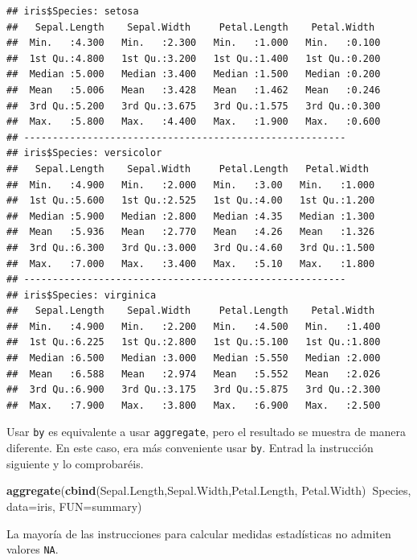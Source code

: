 \documentclass[]{book}
\newenvironment{Shaded}{\begin{snugshade}}{\end{snugshade}}
\newcommand{\DataTypeTok}[1]{\textcolor[rgb]{0.13,0.29,0.53}{#1}}
\newcommand{\KeywordTok}[1]{\textcolor[rgb]{0.13,0.29,0.53}{\textbf{#1}}}
\newcommand{\NormalTok}[1]{#1}
\newcommand{\OperatorTok}[1]{\textcolor[rgb]{0.81,0.36,0.00}{\textbf{#1}}}
\theoremstyle{definition}
\theoremstyle{definition}
\theoremstyle{definition}
\theoremstyle{remark}
\begin{document}
\begin{verbatim}
## iris$Species: setosa
##   Sepal.Length    Sepal.Width     Petal.Length    Petal.Width   
##  Min.   :4.300   Min.   :2.300   Min.   :1.000   Min.   :0.100  
##  1st Qu.:4.800   1st Qu.:3.200   1st Qu.:1.400   1st Qu.:0.200  
##  Median :5.000   Median :3.400   Median :1.500   Median :0.200  
##  Mean   :5.006   Mean   :3.428   Mean   :1.462   Mean   :0.246  
##  3rd Qu.:5.200   3rd Qu.:3.675   3rd Qu.:1.575   3rd Qu.:0.300  
##  Max.   :5.800   Max.   :4.400   Max.   :1.900   Max.   :0.600  
## -------------------------------------------------------- 
## iris$Species: versicolor
##   Sepal.Length    Sepal.Width     Petal.Length   Petal.Width   
##  Min.   :4.900   Min.   :2.000   Min.   :3.00   Min.   :1.000  
##  1st Qu.:5.600   1st Qu.:2.525   1st Qu.:4.00   1st Qu.:1.200  
##  Median :5.900   Median :2.800   Median :4.35   Median :1.300  
##  Mean   :5.936   Mean   :2.770   Mean   :4.26   Mean   :1.326  
##  3rd Qu.:6.300   3rd Qu.:3.000   3rd Qu.:4.60   3rd Qu.:1.500  
##  Max.   :7.000   Max.   :3.400   Max.   :5.10   Max.   :1.800  
## -------------------------------------------------------- 
## iris$Species: virginica
##   Sepal.Length    Sepal.Width     Petal.Length    Petal.Width   
##  Min.   :4.900   Min.   :2.200   Min.   :4.500   Min.   :1.400  
##  1st Qu.:6.225   1st Qu.:2.800   1st Qu.:5.100   1st Qu.:1.800  
##  Median :6.500   Median :3.000   Median :5.550   Median :2.000  
##  Mean   :6.588   Mean   :2.974   Mean   :5.552   Mean   :2.026  
##  3rd Qu.:6.900   3rd Qu.:3.175   3rd Qu.:5.875   3rd Qu.:2.300  
##  Max.   :7.900   Max.   :3.800   Max.   :6.900   Max.   :2.500
\end{verbatim}

Usar \texttt{by} es equivalente a usar \texttt{aggregate}, pero el resultado se muestra de manera diferente. En este caso, era más conveniente usar \texttt{by}. Entrad la instrucción siguiente y lo comprobaréis.

\begin{Shaded}
\begin{Highlighting}[]
\KeywordTok{aggregate}\NormalTok{(}\KeywordTok{cbind}\NormalTok{(Sepal.Length,Sepal.Width,Petal.Length, Petal.Width)}\OperatorTok{~}\NormalTok{Species, }\DataTypeTok{data=}\NormalTok{iris, }\DataTypeTok{FUN=}\NormalTok{summary)}
\end{Highlighting}
\end{Shaded}

La mayoría de las instrucciones para calcular medidas estadísticas no admiten valores \texttt{NA}.
\end{document}
